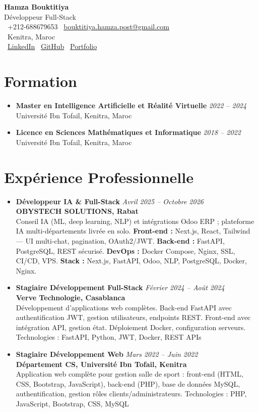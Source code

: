 \documentclass[10pt,a4paper]{article}
\newcommand{\cvheader}[4]{
    \begin{center}
        {\Huge\bfseries #1}\\[0.1em]
        {\large #2}\\[0.1em]
        \faPhone\ #3 \quad \faEnvelope\ \href{mailto:#4}{#4}\\[0.1em]
        \faMapMarker\ Kenitra, Maroc\\[0.1em]
        \faLinkedin\ \href{https://www.linkedin.com/in/hamza-bouktitiya-604471253/}{LinkedIn} \quad
        \faGithub\ \href{https://github.com/gothamza}{GitHub} \quad
        \faGlobe\ \href{https://gothamza.github.io/portfolio/}{Portfolio}
    \end{center}
    \vspace{-0.3em}
}
\newcommand{\cvitem}[2]{\textbf{#1} \hfill \textit{#2}}
\begin{document}
\cvheader{Hamza Bouktitiya}{Développeur Full-Stack}{+212-688679653}{bouktitiya.hamza.post@gmail.com}

\section*{Formation}
\begin{itemize}
    \item \cvitem{Master en Intelligence Artificielle et Réalité Virtuelle}{2022 -- 2024}\\
    Université Ibn Tofail, Kenitra, Maroc
    \item \cvitem{Licence en Sciences Mathématiques et Informatique}{2018 -- 2022}\\
    Université Ibn Tofail, Kenitra, Maroc
\end{itemize}

\section*{Expérience Professionnelle}
\begin{itemize}
    \item \cvitem{Développeur IA \& Full-Stack}{Avril 2025 -- Octobre 2026}\\
    \textbf{OBYSTECH SOLUTIONS, Rabat}\\
    Conseil IA (ML, deep learning, NLP) et intégrations Odoo ERP ; plateforme IA multi-départements livrée en solo. \textbf{Front-end :} Next.js, React, Tailwind --- UI multi-chat, pagination, OAuth2/JWT. \textbf{Back-end :} FastAPI, PostgreSQL, REST sécurisé. \textbf{DevOps :} Docker Compose, Nginx, SSL, CI/CD, VPS. \textbf{Stack :} Next.js, FastAPI, Odoo, NLP, PostgreSQL, Docker, Nginx.
    \item \cvitem{Stagiaire Développement Full-Stack}{Février 2024 -- Août 2024}\\
    \textbf{Verve Technologie, Casablanca}\\
    Développement d'applications web complètes. Back-end FastAPI avec authentification JWT, gestion utilisateurs, endpoints REST. Front-end avec intégration API, gestion état. Déploiement Docker, configuration serveurs. Technologies : FastAPI, Python, JWT, Docker, REST APIs
    \item \cvitem{Stagiaire Développement Web}{Mars 2022 -- Juin 2022}\\
    \textbf{Département CS, Université Ibn Tofail, Kenitra}\\
    Application web complète pour gestion salle de sport : front-end (HTML, CSS, Bootstrap, JavaScript), back-end (PHP), base de données MySQL, authentification, gestion rôles clients/administrateurs. Technologies : PHP, JavaScript, Bootstrap, CSS, MySQL
\end{itemize}
\end{document}
